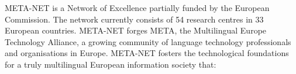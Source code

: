 \begin{multicols}{2}

META-NET is a Network of Excellence partially funded by the European Commission. The network currently consists of 54 research centres in 33 European countries\cite{rehm2011}. META-NET forges META, the Multilingual Europe Technology Alliance, a growing community of language technology professionals and organisations in Europe. META-NET fosters the technological foundations for a truly multilingual European information society that:


\end{multicols}
